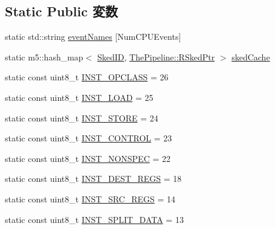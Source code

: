 \subsection*{Static Public 変数}
\begin{DoxyCompactItemize}
\item 
static std::string \hyperlink{classInOrderCPU_a3e78f2c15e35e19acb51c1a41fc51130}{eventNames} \mbox{[}NumCPUEvents\mbox{]}
\item 
static m5::hash\_\-map$<$ \hyperlink{classInOrderCPU_a630137ef811336d3ee312e01adb43991}{SkedID}, \hyperlink{classResourceSked}{ThePipeline::RSkedPtr} $>$ \hyperlink{classInOrderCPU_ac3bde2239116735c8de364fb6c64df5f}{skedCache}
\item 
static const uint8\_\-t \hyperlink{classInOrderCPU_ab0689a51017f8422cab595aed96c6a1a}{INST\_\-OPCLASS} = 26
\item 
static const uint8\_\-t \hyperlink{classInOrderCPU_a5b3806af6c911af84cd16d860f4436b2}{INST\_\-LOAD} = 25
\item 
static const uint8\_\-t \hyperlink{classInOrderCPU_a85aa6196492bed8f13431a172f09b83b}{INST\_\-STORE} = 24
\item 
static const uint8\_\-t \hyperlink{classInOrderCPU_a202c5d802fb841a0c3faf2f36737ecd8}{INST\_\-CONTROL} = 23
\item 
static const uint8\_\-t \hyperlink{classInOrderCPU_a079fa8746c9fa2240354d5e9c476bb24}{INST\_\-NONSPEC} = 22
\item 
static const uint8\_\-t \hyperlink{classInOrderCPU_a89c9d4d44bcca23c206e33116684b91e}{INST\_\-DEST\_\-REGS} = 18
\item 
static const uint8\_\-t \hyperlink{classInOrderCPU_af24bafb407b963ae82732cf776cf40c4}{INST\_\-SRC\_\-REGS} = 14
\item 
static const uint8\_\-t \hyperlink{classInOrderCPU_aadbdb3acfa734a87e0e26c5da208bf11}{INST\_\-SPLIT\_\-DATA} = 13
\end{DoxyCompactItemize}
